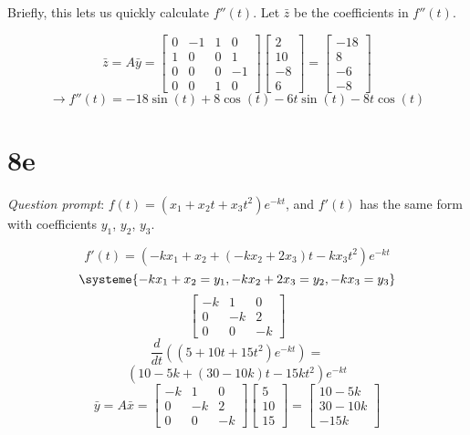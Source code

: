 \documentclass[12pt]{article}
\begin{document}
Briefly, this lets us quickly calculate $f''(t)$. Let $\bar{z}$ be the coefficients in $f''(t)$.

\[
  \bar{z} = A\bar{y} = 
  \begin{bmatrix}
    0 & -1 & 1 & 0 \\
    1 & 0 & 0 & 1 \\
    0 & 0 & 0 & -1 \\
    0 & 0 & 1 & 0 
  \end{bmatrix}
  \begin{bmatrix} 2 \\ 10 \\ -8 \\ 6 \end{bmatrix} = 
  \begin{bmatrix} -18 \\ 8 \\ -6 \\ -8 \end{bmatrix}
\]
\[
  \rightarrow f''(t) = -18\sin(t) + 8\cos(t) - 6t\sin(t) - 8t\cos(t)
\]

\section{8e}

\textit{Question prompt}: $f(t) = (x_1 + x_2t + x_3t^2)e^{-kt}$, and $f'(t)$ has the same
form with coefficients $y_1$, $y_2$, $y_3$.

\[
  f'(t) = (-kx_1 + x_2 + (-kx_2+2x_3)t - kx_3t^2)e^{-kt}
\]
\[
  \systeme{-kx_1 + x_2 = y_1, -kx_2+2x_3 = y_2, -kx_{3} = y_3}
\]
\[
  \begin{bmatrix}
    -k & 1 & 0 \\
    0 & -k & 2 \\
    0 & 0 & -k
  \end{bmatrix}
\]
\[
  \frac{d}{dt}((5+10t+15t^2)e^{-kt}) = 
\]
\[
  (10-5k + (30-10k)t -15kt^2)e^{-kt}
\]
\medbreak{}
\[
  \bar{y} = A\bar{x} = 
  \begin{bmatrix}
    -k & 1 & 0 \\
    0 & -k & 2 \\
    0 & 0 & -k
  \end{bmatrix}
  \begin{bmatrix} 5 \\ 10 \\ 15 \end{bmatrix} = 
  \begin{bmatrix} 10-5k \\ 30-10k \\ -15k \end{bmatrix}
\]
\end{document}
